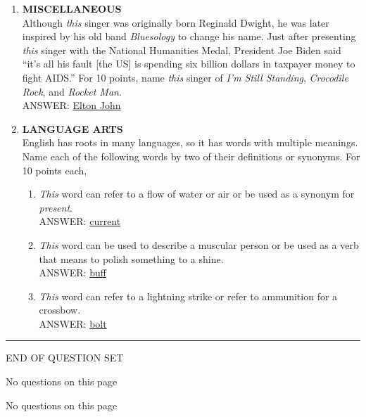 \documentclass{report}
\newcommand*{\backtrack}{\setcounter{enumi}{\numexpr\theenumi-1\relax}}
\begin{document}
\begin{enumerate}
    \item \textbf{MISCELLANEOUS} \\ Although \textit{this} singer was originally born Reginald Dwight, he was later inspired by his old band \textit{Bluesology} to change his name. Just after presenting \textit{this} singer with the National Humanities Medal, President Joe Biden said ``it's all his fault [the US] is spending six billion dollars in taxpayer money to fight AIDS.'' For 10 points, name \textit{this} singer of \textit{I'm Still Standing}, \textit{Crocodile Rock}, and \textit{Rocket Man}. \\ ANSWER: \underline{Elton John} \backtrack
    \item \textbf{LANGUAGE ARTS} \\ English has roots in many languages, so it has words with multiple meanings. Name each of the following words by two of their definitions or synonyms. For 10 points each,
    \begin{enumerate}[label=\Alph*]
        \item \textit{This} word can refer to a flow of water or air or be used as a synonym for \textit{present}. \\ ANSWER: \underline{current}
        \item \textit{This} word can be used to describe a muscular person or be used as a verb that means to polish something to a shine. \\ ANSWER: \underline{buff}
        \item \textit{This} word can refer to a lightning strike or refer to ammunition for a crossbow. \\ ANSWER: \underline{bolt}
    \end{enumerate}


\end{enumerate}


\vspace*{0.5 cm}
\centering
\rule{10 cm}{0.4pt}

\Large
END OF QUESTION SET
\newpage

\vspace*{\fill}
\centering
\thispagestyle{empty}
\Large
No questions on this page
\vspace*{\fill}

\newpage

\vspace*{\fill}
\centering
\thispagestyle{empty}
\Large
No questions on this page
\vspace*{\fill}
\end{document}
